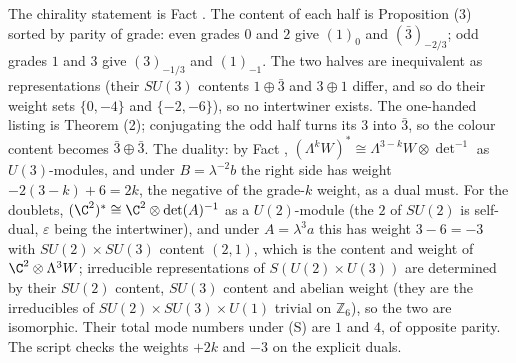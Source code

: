 The chirality statement is Fact . The content of each half is Proposition (3) sorted by parity of grade: even grades $0$ and $2$ give $(1)_{0}$ and $(\bar{3})_{-2/3}$; odd grades $1$ and $3$ give $(3)_{-1/3}$ and $(1)_{-1}$. The two halves are inequivalent as representations (their $SU(3)$ contents $1 \oplus \bar{3}$ and $3 \oplus 1$ differ, and so do their weight sets $\{0, -4\}$ and $\{-2, -6\}$), so no intertwiner exists. The one-handed listing is Theorem (2); conjugating the odd half turns its $3$ into $\bar{3}$, so the colour content becomes $\bar{3} \oplus \bar{3}$. The duality: by Fact , $(\Lambda^{k}W)^{*} \cong \Lambda^{3-k}W \otimes \det^{-1}$ as $U(3)$-modules, and under $B = \lambda^{-2}b$ the right side has weight $-2(3-k) + 6 = 2k$, the negative of the grade-$k$ weight, as a dual must. For the doublets, $(\C^{2})^{*} \cong \C^{2} \otimes \det(A)^{-1}$ as a $U(2)$-module (the $2$ of $SU(2)$ is self-dual, $\varepsilon$ being the intertwiner), and under $A = \lambda^{3}a$ this has weight $3 - 6 = -3$ with $SU(2) \times SU(3)$ content $(2, 1)$, which is the content and weight of $\C^{2} \otimes \Lambda^{3}W$; irreducible representations of $S(U(2) \times U(3))$ are determined by their $SU(2)$ content, $SU(3)$ content and abelian weight (they are the irreducibles of $SU(2) \times SU(3) \times U(1)$ trivial on $\mathbb{Z}_{6}$), so the two are isomorphic. Their total mode numbers under (S) are $1$ and $4$, of opposite parity. The script checks the weights $+2k$ and $-3$ on the explicit duals.
